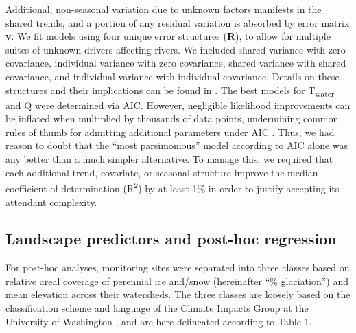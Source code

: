 \documentclass[notitlepage]{article}
\begin{document}
Additional, non-seasonal variation due to unknown factors manifests in the shared trends, and a portion of any residual variation is absorbed by error matrix \textbf{v}. We fit models using four unique error structures (\textbf{R}), to allow for multiple suites of unknown drivers affecting rivers. We included shared variance with zero covariance, individual variance with zero covariance, shared variance with shared covariance, and individual variance with individual covariance. Details on these structures and their implications can be found in \citep{holmes2012marss}. The best models for T\textsubscript{water} and Q were determined via AIC. However, negligible likelihood improvements can be inflated when multiplied by thousands of data points, undermining common rules of thumb for admitting additional parameters under AIC \citep{burnham2003model}. Thus, we had reason to doubt that the ``most parsimonious'' model according to AIC alone was any better than a much simpler alternative. To manage this, we required that each additional trend, covariate, or seasonal structure improve the median coefficient of determination (R\textsuperscript{2}) by at least 1\% in order to justify accepting its attendant complexity.

\subsection*{Landscape predictors and post-hoc regression}
For post-hoc analyses, monitoring sites were separated into three classes based on relative areal coverage of perennial ice and/snow (hereinafter ``\% glaciation'') and mean elevation across their watersheds. The three classes are loosely based on the classification scheme and language of the Climate Impacts Group at the University of Washington \citep{mauger2015CIG}, and are here delineated according to Table 1.
\end{document}
